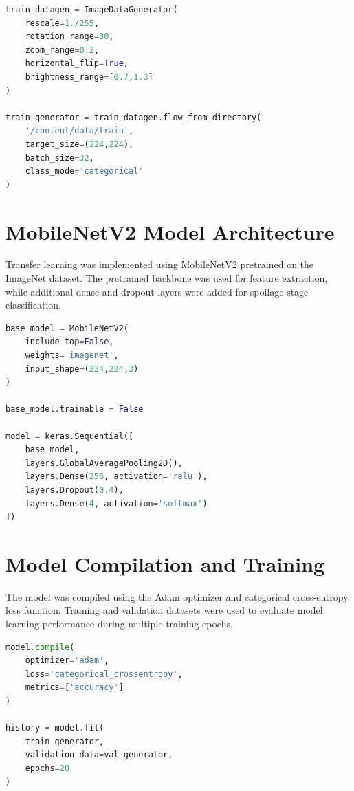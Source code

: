 \begin{lstlisting}[language=Python, caption=Dataset preprocessing and augmentation pipeline]
train_datagen = ImageDataGenerator(
    rescale=1./255,
    rotation_range=30,
    zoom_range=0.2,
    horizontal_flip=True,
    brightness_range=[0.7,1.3]
)

train_generator = train_datagen.flow_from_directory(
    '/content/data/train',
    target_size=(224,224),
    batch_size=32,
    class_mode='categorical'
)
\end{lstlisting}

\section[MobileNetV2 Model Architecture]{\textbf{MobileNetV2 Model Architecture}}
Transfer learning was implemented using MobileNetV2 pretrained on the ImageNet dataset. The pretrained backbone was used for feature extraction, while additional dense and dropout layers were added for spoilage stage classification.

\begin{lstlisting}[language=Python, caption=MobileNetV2 model construction]
base_model = MobileNetV2(
    include_top=False,
    weights='imagenet',
    input_shape=(224,224,3)
)

base_model.trainable = False

model = keras.Sequential([
    base_model,
    layers.GlobalAveragePooling2D(),
    layers.Dense(256, activation='relu'),
    layers.Dropout(0.4),
    layers.Dense(4, activation='softmax')
])
\end{lstlisting}

\section[Model Compilation and Training]{\textbf{Model Compilation and Training}}
The model was compiled using the Adam optimizer and categorical cross-entropy loss function. Training and validation datasets were used to evaluate model learning performance during multiple training epochs.

\begin{lstlisting}[language=Python, caption=Model compilation and training process]
model.compile(
    optimizer='adam',
    loss='categorical_crossentropy',
    metrics=['accuracy']
)

history = model.fit(
    train_generator,
    validation_data=val_generator,
    epochs=20
)
\end{lstlisting}

